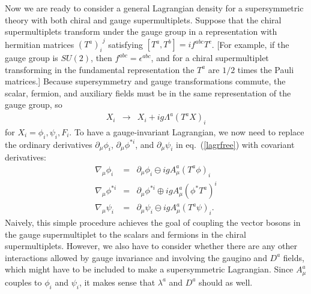 \documentclass[12pt]{article}
\def\BDplus{+}
\def\BDminus{-}
\def\BDplus{-}
\def\BDminus{+}
\def\BDplus{\oplus}
\def\BDminus{\ominus}
\def\BDplus{\ominus}
\def\BDminus{\oplus}
\def\beq{\begin{eqnarray}}
\def\eeq{\end{eqnarray}}
\begin{document}
Now we are ready to consider a general Lagrangian density for a
supersymmetric theory with both chiral and gauge supermultiplets. Suppose
that the chiral supermultiplets transform under the gauge group in a
representation with hermitian matrices ${(T^a)_i}^j$ satisfying $[T^a,T^b]
=i f^{abc} T^c$. [For example, if the gauge group is $SU(2)$, then
$f^{abc} = \epsilon^{abc}$, and 
for a chiral supermultiplet transforming in the fundamental
representation the $T^a$ are $1/2$ times the Pauli
matrices.] Because supersymmetry and gauge transformations commute,
the scalar, fermion, and auxiliary fields must be in the same
representation of the gauge group, so
\beq
X_i &\rightarrow& X_i + ig \Lambda^a (T^a X)_i
\eeq
for $X_i = \phi_i,\psi_i,F_i$.  To have a gauge-invariant Lagrangian, we
now need to replace the ordinary derivatives $\partial_\mu \phi_i$,
$\partial_\mu \phi^{*i}$, and $\partial_\mu \psi_i$ 
in eq.~(\ref{lagrfree}) with covariant derivatives:
\beq
\nabla_\mu \phi_i &=& \partial_\mu \phi_i \BDplus i g A^a_\mu (T^a\phi)_i
\label{ordtocovphi}
\\
\nabla_\mu \phi^{*i} &=& \partial_\mu \phi^{*i} \BDminus i g A^a_\mu (\phi^* T^a)^i
\\
\nabla_\mu \psi_i &=& \partial_\mu \psi_i \BDplus i g A^a_\mu (T^a\psi)_i .
\label{ordtocovpsi}
\eeq
Naively, this simple procedure achieves the goal of coupling the vector
bosons in the gauge supermultiplet to the scalars and fermions in the
chiral supermultiplets. However, we also have to consider whether there
are any other interactions allowed by gauge invariance and involving the
gaugino and $D^a$ fields, which might have to be included to make a
supersymmetric Lagrangian. Since $A^a_\mu$ couples to $\phi_i$ and
$\psi_i$, it makes sense that $\lambda^a$ and $D^a$ should as well. 
\end{document}
